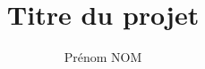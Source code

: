 \documentclass[pfe ,titlesmallcaps]{isipfe}
\begin{document}
\frontmatter

\title{Titre du projet}
\author{Prénom NOM}



\setcounter{secnumdepth}{3}
\setcounter{tocdepth}{2}
\tableofcontents

\listoffigures
\listoftables


\mainmatter













\backmatter


\end{document}
